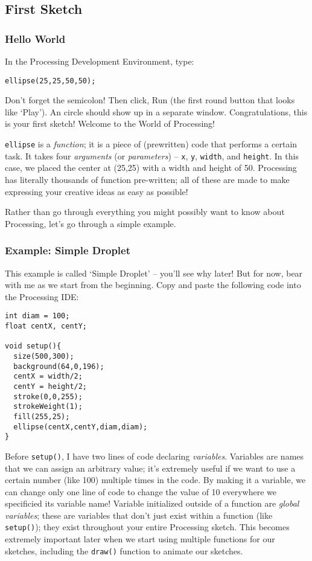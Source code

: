 \subsection{First Sketch}
\subsubsection{Hello World}
In the Processing Development Environment, type:

\begin{verbatim}
ellipse(25,25,50,50);
\end{verbatim}

Don't forget the semicolon!  Then click, Run (the first round button that looks like `Play').  An circle should show up in a separate window.  Congratulations, this is your first sketch!  Welcome to the World of Processing!

\texttt{ellipse} is a \emph{function}; it is a piece of (prewritten) code that performs a certain task.  It takes four \emph{arguments} (or \emph{parameters}) -- \texttt{x}, \texttt{y}, \texttt{width}, and \texttt{height}.  In this case, we placed the center at (25,25) with a width and height of 50.  Processing has literally thousands of function pre-written; all of these are made to make expressing your creative ideas as easy as possible!

Rather than go through everything you might possibly want to know about Processing, let's go through a simple example.

\subsubsection{Example: Simple Droplet}
This example is called `Simple Droplet' -- you'll see why later!  But for now, bear with me as we start from the beginning.  Copy and paste the following code into the Processing IDE:

\begin{verbatim}
int diam = 100;
float centX, centY;

void setup(){
  size(500,300);
  background(64,0,196);
  centX = width/2;
  centY = height/2;
  stroke(0,0,255);
  strokeWeight(1);
  fill(255,25);
  ellipse(centX,centY,diam,diam);
}
\end{verbatim}

Before \texttt{setup()}, I have two lines of code declaring \emph{variables}.  Variables are names that we can assign an arbitrary value; it's extremely useful if we want to use a certain number (like 100) multiple times in the code.  By making it a variable, we can change only one line of code to change the value of 10 everywhere we specificied its variable name!  Variable initialized outside of a function are \emph{global variables}; these are variables that don't just exist within a function (like \texttt{setup()}); they exist throughout your entire Processing sketch.  This becomes extremely important later when we start using multiple functions for our sketches, including the \texttt{draw()} function to animate our sketches.

